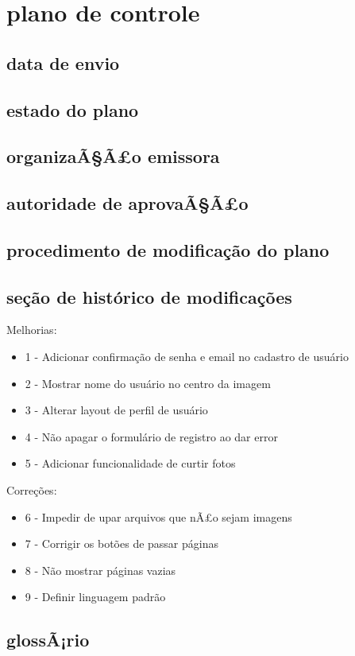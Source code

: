 \chapter{plano de controle}

\section{data de envio}

\section{estado do plano}

\section{organizaÃ§Ã£o emissora}

\section{autoridade de aprovaÃ§Ã£o}

\section{procedimento de modificação do plano}

\section{seção de histórico de modificações}

Melhorias:

 \begin{itemize}
   \item 1 - Adicionar confirmação de senha e email no cadastro de usuário
   \item 2 - Mostrar nome do usuário no centro da imagem
   \item 3 - Alterar layout de perfil de usuário
   \item 4 - Não apagar o formulário de registro ao dar error
   \item 5 - Adicionar funcionalidade de curtir fotos
 \end{itemize}

Correções:

 \begin{itemize}
   \item 6 - Impedir de upar arquivos que nÃ£o sejam imagens
   \item 7 - Corrigir os botões de passar páginas
   \item 8 - Não mostrar páginas vazias
   \item 9 - Definir linguagem padrão
 \end{itemize}

\section{glossÃ¡rio}
